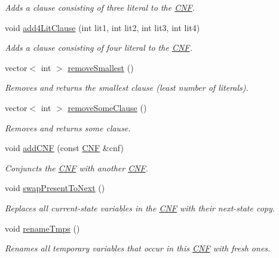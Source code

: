 \begin{DoxyCompactItemize}
\begin{DoxyCompactList}\small\item\em Adds a clause consisting of three literal to the \hyperlink{classCNF}{C\-N\-F}. \end{DoxyCompactList}\item 
void \hyperlink{classCNF_adc908d03185c0baad55c5b240ed667b3}{add4\-Lit\-Clause} (int lit1, int lit2, int lit3, int lit4)
\begin{DoxyCompactList}\small\item\em Adds a clause consisting of four literal to the \hyperlink{classCNF}{C\-N\-F}. \end{DoxyCompactList}\item 
vector$<$ int $>$ \hyperlink{classCNF_ad2ccf3122438927b7d5989c34651bd7e}{remove\-Smallest} ()
\begin{DoxyCompactList}\small\item\em Removes and returns the smallest clause (least number of literals). \end{DoxyCompactList}\item 
vector$<$ int $>$ \hyperlink{classCNF_ac7fef61f8d052bfca0f5cd8f80ca8e1d}{remove\-Some\-Clause} ()
\begin{DoxyCompactList}\small\item\em Removes and returns some clause. \end{DoxyCompactList}\item 
void \hyperlink{classCNF_a037291a95be5b4ec0c14755fd0e18826}{add\-C\-N\-F} (const \hyperlink{classCNF}{C\-N\-F} \&cnf)
\begin{DoxyCompactList}\small\item\em Conjuncts the \hyperlink{classCNF}{C\-N\-F} with another \hyperlink{classCNF}{C\-N\-F}. \end{DoxyCompactList}\item 
void \hyperlink{classCNF_aff6cbbe38a345089b278061f9d0195be}{swap\-Present\-To\-Next} ()
\begin{DoxyCompactList}\small\item\em Replaces all current-\/state variables in the \hyperlink{classCNF}{C\-N\-F} with their next-\/state copy. \end{DoxyCompactList}\item 
void \hyperlink{classCNF_ab8fa6b10b2a85ff8f055d6bc926f2c44}{rename\-Tmps} ()
\begin{DoxyCompactList}\small\item\em Renames all temporary variables that occur in this \hyperlink{classCNF}{C\-N\-F} with fresh ones. \end{DoxyCompactList}\item 

\end{DoxyCompactItemize}

